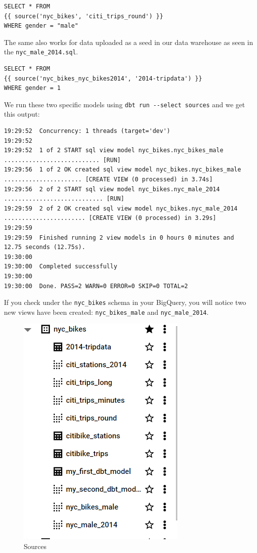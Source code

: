 \documentclass[
]{book}
\begin{document}
\begin{verbatim}
SELECT * FROM 
{{ source('nyc_bikes', 'citi_trips_round') }}
WHERE gender = "male"
\end{verbatim}

The same also works for data uploaded as a seed in our data warehouse as seen in the \texttt{nyc\_male\_2014.sql}.

\begin{verbatim}
SELECT * FROM 
{{ source('nyc_bikes_nyc_bikes2014', '2014-tripdata') }}
WHERE gender = 1
\end{verbatim}

We run these two specific models using \texttt{dbt\ run\ -\/-select\ sources} and we get this output:

\begin{verbatim}
19:29:52  Concurrency: 1 threads (target='dev')
19:29:52  
19:29:52  1 of 2 START sql view model nyc_bikes.nyc_bikes_male ........................... [RUN]
19:29:56  1 of 2 OK created sql view model nyc_bikes.nyc_bikes_male ...................... [CREATE VIEW (0 processed) in 3.74s]
19:29:56  2 of 2 START sql view model nyc_bikes.nyc_male_2014 ............................ [RUN]
19:29:59  2 of 2 OK created sql view model nyc_bikes.nyc_male_2014 ....................... [CREATE VIEW (0 processed) in 3.29s]
19:29:59  
19:29:59  Finished running 2 view models in 0 hours 0 minutes and 12.75 seconds (12.75s).
19:30:00  
19:30:00  Completed successfully
19:30:00  
19:30:00  Done. PASS=2 WARN=0 ERROR=0 SKIP=0 TOTAL=2
\end{verbatim}

If you check under the \texttt{nyc\_bikes} schema in your BigQuery, you will notice two new views have been created: \texttt{nyc\_bikes\_male} and \texttt{nyc\_male\_2014}.

\begin{figure}
\centering
\includegraphics{./images/sources.png}
\caption{Sources}
\end{figure}
\end{document}
